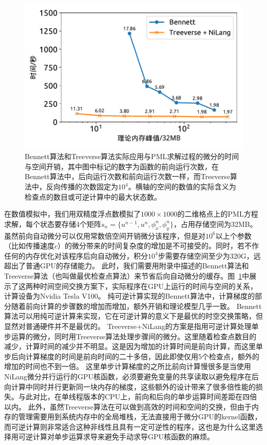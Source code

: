 \documentclass[A4,twoside,UTF8]{ctexart}
\begin{document}
\begin{figure}[t]
\centering
\includegraphics[width=0.6\columnwidth]{./fig5.pdf}
    \caption{Bennett算法和Treeverse算法实际应用与PML求解过程的微分的时间与空间开销，其中图中标记的数字为函数的前向运行次数，在Bennett算法中，后向运行次数和前向运行次数一样，而Treeverse算法中，反向传播的次数固定为$10^4$。横轴的空间的数值的实际含义为检查点的数目或可逆计算中的最大状态数。\label{fig:seismic}}
\end{figure}

在数值模拟中，我们用双精度浮点数模拟了$1000 \times 1000$的二维格点上的PML方程求解，每个状态要存储4个矩阵$s_n = \{u^{n-1}, u^n, \phi_x^n, \phi_y^n\}$，占用存储空间为32MB。
虽然前向自动微分可以仅用常数倍空间开销微分该程序，但是对$10^6$以上个参数（比如传播速度$c$）的微分带来的时间复杂度的增加是不可接受的。同时，若不作任何的内存优化对该程序后向自动微分，积分$10^4$步需要存储空间至少为320G，远超出了普通GPU的存储能力。
此时，我们需要用附录中描述的Bennett算法和Treeverse算法（也叫做最优检查点算法）来节省后向自动微分的缓存。图~\ref{fig:seismic}中展示了这两种时间空间交换方案下，实际程序在GPU上运行的时间与空间的关系，计算设备为Nvidia Tesla V100。
纯可逆计算实现的Bennett算法中，计算梯度的部分随着前向计算的步骤数的增加而增加，额外开销和理论模型几乎一致。
Bennett算法可以用纯可逆计算来实现，它在可逆计算的意义下是最优的时空交换策略，但显然对普通硬件并不是最优的。
Treeverse+NiLang的方案是指用可逆计算处理单步运算的微分，同时用Treeverse算法处理步骤间的微分。这里随着检查点数目的减少，计算时间的减少并不明显。这是因为增加的计算时间是前向计算，而这里单步后向计算梯度的时间是前向时间的二十多倍，因此即使仅用5个检查点，额外的增加的时间也不到一倍。
这里单步计算梯度的之所比前向计算慢很多是当使用NiLang微分并行运行的GPU核函数，必须要避免变量的共享读取以避免程序在后向计算中同时并行更新同一块内存的梯度，这些额外的设计带来了很多倍性能的损失。与此对比，在单线程版本的CPU上，前向和后向的单步运算时间差距在四倍以内。
此外，虽然Treeverse算法在可以做到高效的时间和空间的交换，但由于内存的管理需要用到系统内存中的全局堆栈，无法直接用于微分GPU的kernel函数，而可逆计算则非常适合这种非线性且具有一定可逆性的程序，这也是为什么这里选择用可逆计算对单步运算求导来避免手动求导GPU核函数的麻烦。
\end{document}
